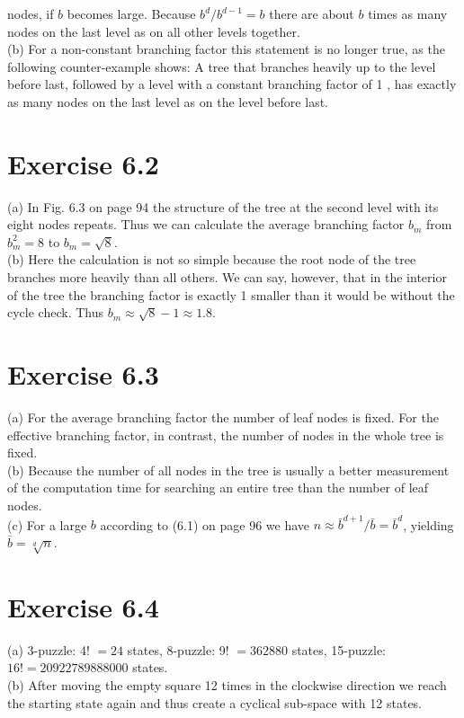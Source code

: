 \documentclass[10pt]{book}
\begin{document}
nodes, if $b$ becomes large. Because $b^{d} / b^{d-1}=b$ there are about $b$ times as many nodes on the last level as on all other levels together.\\
(b) For a non-constant branching factor this statement is no longer true, as the following counter-example shows: A tree that branches heavily up to the level before last, followed by a level with a constant branching factor of 1 , has exactly as many nodes on the last level as on the level before last.

\section{Exercise 6.2}
(a) In Fig. 6.3 on page 94 the structure of the tree at the second level with its eight nodes repeats. Thus we can calculate the average branching factor $b_{m}$ from $b_{m}^{2}=8$ to $b_{m}=\sqrt{8}$.\\
(b) Here the calculation is not so simple because the root node of the tree branches more heavily than all others. We can say, however, that in the interior of the tree the branching factor is exactly 1 smaller than it would be without the cycle check. Thus $b_{m} \approx \sqrt{8}-1 \approx 1.8$.

\section{Exercise 6.3}
(a) For the average branching factor the number of leaf nodes is fixed. For the effective branching factor, in contrast, the number of nodes in the whole tree is fixed.\\
(b) Because the number of all nodes in the tree is usually a better measurement of the computation time for searching an entire tree than the number of leaf nodes.\\
(c) For a large $b$ according to (6.1) on page 96 we have $n \approx \bar{b}^{d+1} / \bar{b}=\bar{b}^{d}$, yielding $\bar{b}=\sqrt[d]{n}$.

\section{Exercise 6.4}
(a) 3-puzzle: 4! $=24$ states, 8-puzzle: 9! $=362880$ states, 15-puzzle: $16!=20922789888000$ states.\\
(b) After moving the empty square 12 times in the clockwise direction we reach the starting state again and thus create a cyclical sub-space with 12 states.
\end{document}
